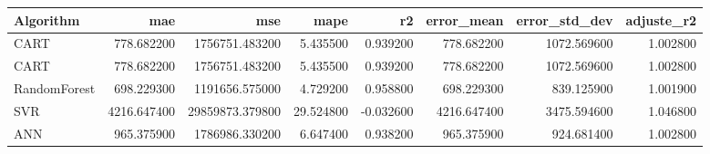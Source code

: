 \begin{tabular}{lrrrrrrr}
\toprule
Algorithm & mae & mse & mape & r2 & error_mean & error_std_dev & adjuste_r2 \\
\midrule
CART & 778.682200 & 1756751.483200 & 5.435500 & 0.939200 & 778.682200 & 1072.569600 & 1.002800 \\
CART & 778.682200 & 1756751.483200 & 5.435500 & 0.939200 & 778.682200 & 1072.569600 & 1.002800 \\
RandomForest & 698.229300 & 1191656.575000 & 4.729200 & 0.958800 & 698.229300 & 839.125900 & 1.001900 \\
SVR & 4216.647400 & 29859873.379800 & 29.524800 & -0.032600 & 4216.647400 & 3475.594600 & 1.046800 \\
ANN & 965.375900 & 1786986.330200 & 6.647400 & 0.938200 & 965.375900 & 924.681400 & 1.002800 \\
\bottomrule
\end{tabular}

